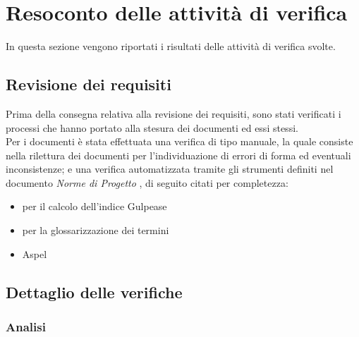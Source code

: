 \section{Resoconto delle attività di verifica}
  In questa sezione vengono riportati i risultati delle attività di verifica svolte.
  \subsection{Revisione dei requisiti}
  Prima della consegna relativa alla revisione dei requisiti, sono stati verificati i processi che hanno portato alla stesura dei documenti ed essi stessi. \\
  Per i documenti è stata effettuata una verifica di tipo manuale, la quale consiste nella rilettura dei documenti per l'individuazione di errori di forma ed eventuali inconsistenze;
  e una verifica automatizzata tramite gli strumenti definiti nel documento \emph{Norme di Progetto \VersioneNP{}}, di seguito citati per completezza:
  \begin{itemize}
    \item {}  per il calcolo dell’indice Gulpease
    \item {}  per la glossarizzazione dei termini
    \item Aspel
  \end{itemize}
  \subsection{Dettaglio delle verifiche}
    \subsubsection{Analisi}
